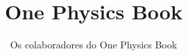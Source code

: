 \documentclass[11pt,a4paper,twoside,openany]{book}
\title{One Physics Book}
\author{Os colaboradores do One Physics Book}
\date{\bookdate}
\begin{document}
\frontmatter



\tableofcontents

\mainmatter





\appendix
\part{\omsolutionspart}




\backmatter
\printindex
\end{document}
